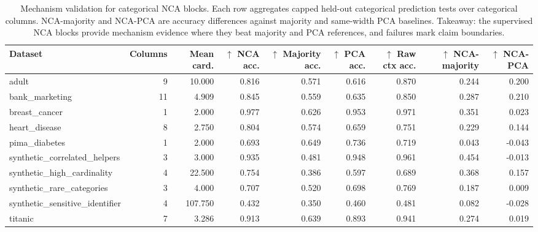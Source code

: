 \begin{table}
\caption{Mechanism validation for categorical NCA blocks. Each row aggregates capped held-out categorical prediction tests over categorical columns. NCA-majority and NCA-PCA are accuracy differences against majority and same-width PCA baselines. Takeaway: the supervised NCA blocks provide mechanism evidence where they beat majority and PCA references, and failures mark claim boundaries.}
\label{tab:mechanism-validation}
\begin{adjustbox}{max width=\textwidth}
\begin{tabular}{lrrrrrrrr}
\toprule
Dataset & Columns & Mean card. & $\uparrow$ NCA acc. & $\uparrow$ Majority acc. & $\uparrow$ PCA acc. & $\uparrow$ Raw ctx acc. & $\uparrow$ NCA-majority & $\uparrow$ NCA-PCA \\
\midrule
adult & 9 & 10.000 & 0.816 & 0.571 & 0.616 & 0.870 & 0.244 & 0.200 \\
bank\_marketing & 11 & 4.909 & 0.845 & 0.559 & 0.635 & 0.850 & 0.287 & 0.210 \\
breast\_cancer & 1 & 2.000 & 0.977 & 0.626 & 0.953 & 0.971 & 0.351 & 0.023 \\
heart\_disease & 8 & 2.750 & 0.804 & 0.574 & 0.659 & 0.751 & 0.229 & 0.144 \\
pima\_diabetes & 1 & 2.000 & 0.693 & 0.649 & 0.736 & 0.719 & 0.043 & -0.043 \\
synthetic\_correlated\_helpers & 3 & 3.000 & 0.935 & 0.481 & 0.948 & 0.961 & 0.454 & -0.013 \\
synthetic\_high\_cardinality & 4 & 22.500 & 0.754 & 0.386 & 0.597 & 0.689 & 0.368 & 0.157 \\
synthetic\_rare\_categories & 3 & 4.000 & 0.707 & 0.520 & 0.698 & 0.769 & 0.187 & 0.009 \\
synthetic\_sensitive\_identifier & 4 & 107.750 & 0.432 & 0.350 & 0.460 & 0.481 & 0.082 & -0.028 \\
titanic & 7 & 3.286 & 0.913 & 0.639 & 0.893 & 0.941 & 0.274 & 0.019 \\
\bottomrule
\end{tabular}
\end{adjustbox}
\end{table}
